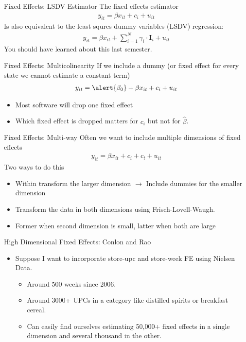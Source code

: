 \begin{frame}{Fixed Effects: LSDV Estimator}
The fixed effects estimator
\begin{align*}
y_{it} = \beta x_{it} + c_i + u_{it}
\end{align*}
Is also equivalent to the least squres dummy variables (LSDV) regression:
\begin{align*}
y_{it} = \beta x_{it} + \sum_{i=1}^N \gamma_i \cdot \mathbf{I}_{i} + u_{it}
\end{align*}
You should have learned about this last semester.
\end{frame}


\begin{frame}{Fixed Effects: Multicolinearity}
If we include a dummy (or fixed effect for every state we cannot estimate a constant term)
\begin{align*}
y_{it} = \alert{\beta_0} + \beta x_{it} + c_i + u_{it}
\end{align*}
\begin{itemize}
\item Most software will drop one fixed effect
\item Which fixed effect is dropped matters for $c_i$ but not for $\widehat{\beta}$.    
\end{itemize}
\end{frame}

\begin{frame}{Fixed Effects: Multi-way}
Often we want to include multiple dimensions of fixed effects
\begin{align*}
y_{it} =\beta x_{it} + c_i + c_t + u_{it}
\end{align*}
Two ways to do this
\begin{itemize}
\item Within transform the larger dimension $\rightarrow$ Include dummies for the smaller dimension
\item Transform the data in both dimensions using \alert{Frisch-Lovell-Waugh}.
\item Former when second dimension is small, latter when both are large
\end{itemize}
\end{frame}


\begin{frame}{High Dimensional Fixed Effects: Conlon and Rao} 
\begin{itemize}
 \item Suppose I want to incorporate \alert{store-upc} and \alert{store-week} FE using Nielsen Data.
\begin{itemize}
\item Around 500 weeks since 2006.
\item Around 3000+ UPCs in a category like distilled spirits or breakfast cereal.
\item Can easily find ourselves estimating 50,000+ fixed effects in a single dimension and several thousand in the other.
\end{itemize}
  \end{itemize}
\end{frame}



